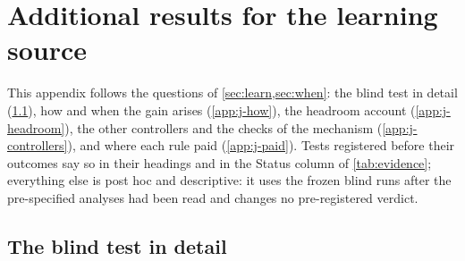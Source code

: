 \section{Additional results for the learning source}\label{app:moreresults}
This appendix follows the questions of \cref{sec:learn,sec:when}: the blind test in detail (\cref{app:j-blind}), how and when
the gain arises (\cref{app:j-how}), the headroom account (\cref{app:j-headroom}), the other controllers and the checks of the
mechanism (\cref{app:j-controllers}), and where each rule paid (\cref{app:j-paid}). Tests registered before their outcomes say so in their headings and in the
Status column of \cref{tab:evidence}; everything else is post hoc and descriptive: it uses the frozen blind runs after the
pre-specified analyses had been read and changes no pre-registered verdict.

\subsection{The blind test in detail}\label{app:j-blind}
